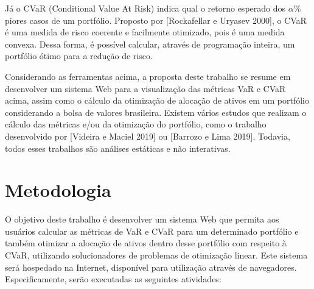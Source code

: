 \documentclass[12pt, oneside, a4paper,english,brazil]{abntex2}
\begin{document}
Já o CVaR (Conditional Value At Risk) indica qual o retorno esperado dos $\alpha\%$ piores casos de um portfólio. Proposto por [Rockafellar e Uryasev 2000]\nocite{Rockafellar2000}, o CVaR é uma medida de risco coerente e facilmente otimizado, pois é uma medida convexa. Dessa forma, é possível calcular, através de programação inteira, um portfólio ótimo para a redução de risco.

Considerando as ferramentas acima, a proposta deste trabalho se resume em desenvolver um sistema Web para a visualização das métricas VaR e CVaR acima, assim como o cálculo da otimização de alocação de ativos em um portfólio considerando a bolsa de valores brasileira. Existem vários estudos que realizam o cálculo das métricas e/ou da otimização do portfólio, como o trabalho desenvolvido por [Videira e Maciel 2019]\nocite{Maciel2019} ou [Barrozo e Lima 2019]\nocite{Gabriel2019}. Todavia, todos esses trabalhos são análises estáticas e não interativas.

\chapter{Metodologia}
O objetivo deste trabalho é desenvolver um sistema Web que permita aos usuários calcular as métricas de VaR e CVaR para um determinado portfólio e também otimizar a alocação de ativos dentro desse portfólio com respeito à CVaR, utilizando solucionadores de problemas de otimização linear. Este sistema será hospedado na Internet, disponível para utilização através de navegadores. Especificamente, serão executadas as seguintes atividades:
\end{document}
